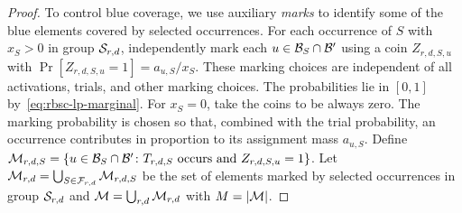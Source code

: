 \begin{proof}
To control blue coverage, we use auxiliary \emph{marks} to identify some of the blue elements covered by selected occurrences. For each occurrence of $S$ with $x_S>0$ in group $\mathcal{S}_{r,d}$, independently mark each $u\in\mathcal{B}_S\cap\mathcal{B}'$ using a coin $Z_{r,d,S,u}$ with $\Pr[Z_{r,d,S,u}=1]=a_{u,S}/x_S$. These marking choices are independent of all activations, trials, and other marking choices. The probabilities lie in $[0,1]$ by~\eqref{eq:rbsc-lp-marginal}. For $x_S=0$, take the coins to be always zero. The marking probability is chosen so that, combined with the trial probability, an occurrence contributes in proportion to its assignment mass $a_{u,S}$. Define $\mathcal{M}_{r,d,S}=\mathopen{}\left\{ u\in\mathcal{B}_S\cap\mathcal{B}'\colon T_{r,d,S}\text{ occurs and }Z_{r,d,S,u}=1 \right\}$. Let $\mathcal{M}_{r,d}=\bigcup_{S\in\mathcal{F}_{r,d}}\mathcal{M}_{r,d,S}$ be the set of elements marked by selected occurrences in group $\mathcal{S}_{r,d}$ and $\mathcal{M}=\bigcup_{r,d}\mathcal{M}_{r,d}$ with $M=\mathopen{}\left| \mathcal{M} \right|$.


\end{proof}
